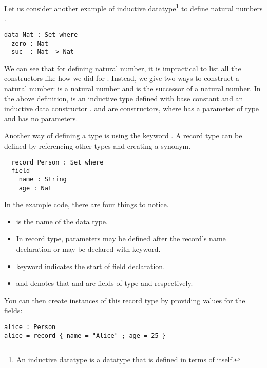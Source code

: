 Let us consider another example of inductive datatype\footnote{An inductive
datatype is a datatype that is defined in terms of itself.} to define natural
numbers . 
\label{code:Nat}
\begin{verbatim}
data Nat : Set where
  zero : Nat
  suc  : Nat -> Nat
\end{verbatim}

We can see that for defining natural number, it is impractical to list all the
constructors like how we did for . Instead, we give two ways to
construct a natural number:  is a natural number and 
is the successor of a natural number. In the above definition,  is
an inductive type defined with base constant  and an inductive data
constructor .  and  are constructors, where
 has a parameter of type  and  has no
parameters. 

Another way of defining a type is using the keyword . A record
type can be defined by referencing other types and creating a synonym. 

\begin{verbatim}
  record Person : Set where
  field
    name : String
    age : Nat
\end{verbatim}

In the example code, there are four things to notice.
\begin{itemize}
  \item {} is the name of the data type.
  \item In record type, parameters may be defined after the record's name
  declaration or may be declared with  keyword.
  \item {} keyword indicates the start of field declaration.
  \item {} and  denotes that 
  and  are fields of type  and 
  respectively.
\end{itemize}

You can then create instances of this record type by providing values for the
fields:

\begin{verbatim}
alice : Person
alice = record { name = "Alice" ; age = 25 }
\end{verbatim}

